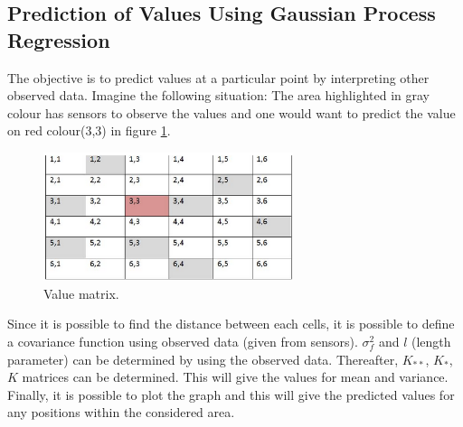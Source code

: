 \subsection{Prediction of Values Using Gaussian Process Regression}
The objective is to predict values at a particular point by interpreting other observed data. Imagine the following situation: The area highlighted in gray colour has sensors to observe the values and one would want to predict the value on red colour(3,3) in figure \ref{fig:value-matrix}.
\begin{figure}[here]
  \centering
      \includegraphics[width=0.65\textwidth]{theory/graphics/value-matrix.png}
  \caption{ Value matrix. }
  \label{fig:value-matrix}
\end{figure}
Since it is possible to find the distance between each cells, it is possible to define a covariance function using observed data (given from sensors). $ \sigma_{f}^{2} $ and $ l $ (length parameter) can be determined by using the observed data. Thereafter, $ K_{**} $, $ K_{*} $, $ K $ matrices can be determined. This will give the values for mean and variance. Finally, it is possible to plot the graph and this will give the predicted values for any positions within the considered area.
